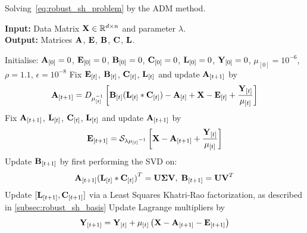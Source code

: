 \begin{algorithm}[t]
    \caption{Solving~\eqref{eq:robust_sh_problem} by the ADM method.}
\label{alg:adm_solution}
    {\scriptsize\textbf{Input:} Data Matrix $\boldsymbol{\mathbf{X}} \in \mathbb{R}^{d \times n}$ and parameter $\lambda$.} \\
    {\scriptsize\textbf{Output:} Matrices $\boldsymbol{\mathbf{A}}$, $\boldsymbol{\mathbf{E}}$, $\boldsymbol{\mathbf{B}}$, $\boldsymbol{\mathbf{C}}$, $\boldsymbol{\mathbf{L}}$.}  \\
{
    \scriptsize
    \def\At{{\bb{A}_{[t]}}}
    \def\Et{{\bb{E}_{[t]}}}
    \def\Ct{{\bb{C}_{[t]}}}
    \def\Lt{{\bb{L}_{[t]}}}
    \def\Bt{{\bb{B}_{[t]}}}
    \def\Yt{{\bb{Y}_{[t]}}}
    \def\mut{{\mu_{[t]}}}
    \def\X{{\bb{X}}}
    
    \begin{algorithmic}[1]
        \STATE{} Initialise: $\boldsymbol{\mathbf{A}}_{[0]} = 0$, $\boldsymbol{\mathbf{E}}_{[0]} = 0$, $\boldsymbol{\mathbf{B}}_{[0]} = 0$, $\boldsymbol{\mathbf{C}}_{[0]} = 0$, $\boldsymbol{\mathbf{L}}_{[0]} = 0$, $\boldsymbol{\mathbf{Y}}_{[0]} = 0$, $\mu_{[0]} = 10^{-6}$, $\rho = 1.1$, $\epsilon = 10^{-8}$
            \STATE{} Fix $\Et$, $\Bt$, $\Ct$, $\Lt$ and update $\boldsymbol{\mathbf{A}}_{[t + 1]}$ by
                \begin{equation}\label{eq:A_update}
                    \bb{A}_{[t+1]} = D_{\mu_{[t]}^{-1}} \left[  \Bt ( \Lt \ast \Ct ) - \At + \X - \Et + \frac{\Yt}{\mut} \right]
                \end{equation}
            \STATE{} Fix $\boldsymbol{\mathbf{A}}_{[t+1]}$, $\Lt$, $\Ct$, $\Lt$ and update $\boldsymbol{\mathbf{A}}_{[t + 1]}$ by
                \begin{equation}\label{eq:E_update}
                    \bb{E}_{[t+1]} = \mathcal{S}_{\lambda \mut^{-1}} \left[ \X - \bb{A}_{[t+1]} + \frac{\Yt}{\mut} \right]
                \end{equation}
            \STATE{} Update $\boldsymbol{\mathbf{B}}_{[t+1]}$ by first performing the SVD on:
                \begin{equation}\label{eq:ALC_svd}
                    \bb{A}_{[t+1]} {(\Lt \ast \Ct)}^T = \bb{U} \bb{\Sigma} \bb{V}, \; \bb{B}_{[t+1]} = \bb{U} \bb{V}^T
                \end{equation}
            \STATE{} Update $[\boldsymbol{\mathbf{L}}_{[t+1]}, \boldsymbol{\mathbf{C}}_{[t+1]}]$ via a Least Squares Khatri-Rao factorization, as described in \cref{subsec:robust_sh_basis}
            \STATE{} Update Lagrange multipliers by
                \begin{equation}\label{eq:Y_update}
                    \bb{Y}_{[t+1]} = \Yt + \mut \left( \X - \bb{A}_{[t+1]} - \bb{E}_{[t+1]} \right)

\end{equation}
\end{algorithmic}}
\end{algorithm}
